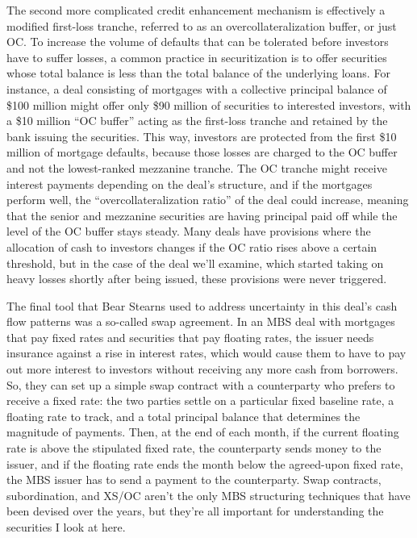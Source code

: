 \documentclass[12pt]{article}
\begin{document}
The second more complicated credit enhancement mechanism is effectively a modified first-loss tranche, referred to as an overcollateralization buffer, or just OC. To increase the volume of defaults that can be tolerated before investors have to suffer losses, a common practice in securitization is to offer securities whose total balance is less than the total balance of the underlying loans. For instance, a deal consisting of mortgages with a collective principal balance of \$100 million might offer only \$90 million of securities to interested investors, with a \$10 million “OC buffer” acting as the first-loss tranche and retained by the bank issuing the securities. This way, investors are protected from the first \$10 million of mortgage defaults, because those losses are charged to the OC buffer and not the lowest-ranked mezzanine tranche. The OC tranche might receive interest payments depending on the deal’s structure, and if the mortgages perform well, the “overcollateralization ratio” of the deal could increase, meaning that the senior and mezzanine securities are having principal paid off while the level of the OC buffer stays steady. Many deals have provisions where the allocation of cash to investors changes if the OC ratio rises above a certain threshold, but in the case of the deal we’ll examine, which started taking on heavy losses shortly after being issued, these provisions were never triggered.
	
	The final tool that Bear Stearns used to address uncertainty in this deal's cash flow patterns was a so-called swap agreement. In an MBS deal with mortgages that pay fixed rates and securities that pay floating rates, the issuer needs insurance against a rise in interest rates, which would cause them to have to pay out more interest to investors without receiving any more cash from borrowers. So, they can set up a simple swap contract with a counterparty who prefers to receive a fixed rate: the two parties settle on a particular fixed baseline rate, a floating rate to track, and a total principal balance that determines the magnitude of payments. Then, at the end of each month, if the current floating rate is above the stipulated fixed rate, the counterparty sends money to the issuer, and if the floating rate ends the month below the agreed-upon fixed rate, the MBS issuer has to send a payment to the counterparty. Swap contracts, subordination, and XS/OC aren’t the only MBS structuring techniques that have been devised over the years, but they’re all important for understanding the securities I look at here.
\end{document}
